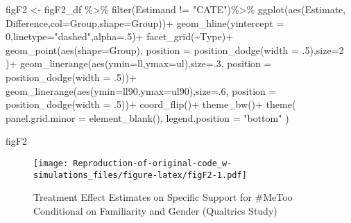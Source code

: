 \documentclass[
]{article}
\newenvironment{Shaded}{\begin{snugshade}}{\end{snugshade}}
\newcommand{\AttributeTok}[1]{\textcolor[rgb]{0.77,0.63,0.00}{#1}}
\newcommand{\DecValTok}[1]{\textcolor[rgb]{0.00,0.00,0.81}{#1}}
\newcommand{\FunctionTok}[1]{\textcolor[rgb]{0.00,0.00,0.00}{#1}}
\newcommand{\NormalTok}[1]{#1}
\newcommand{\OtherTok}[1]{\textcolor[rgb]{0.56,0.35,0.01}{#1}}
\newcommand{\SpecialCharTok}[1]{\textcolor[rgb]{0.00,0.00,0.00}{#1}}
\newcommand{\StringTok}[1]{\textcolor[rgb]{0.31,0.60,0.02}{#1}}
\begin{document}
\begin{Shaded}
\begin{Highlighting}[]
\NormalTok{figF2 }\OtherTok{\textless{}{-}}\NormalTok{ figF2\_df }\SpecialCharTok{\%\textgreater{}\%}
  \FunctionTok{filter}\NormalTok{(Estimand }\SpecialCharTok{!=} \StringTok{"CATE"}\NormalTok{)}\SpecialCharTok{\%\textgreater{}\%}
  \FunctionTok{ggplot}\NormalTok{(}\FunctionTok{aes}\NormalTok{(Estimate, Difference,}\AttributeTok{col=}\NormalTok{Group,}\AttributeTok{shape=}\NormalTok{Group))}\SpecialCharTok{+}
  \FunctionTok{geom\_hline}\NormalTok{(}\AttributeTok{yintercept =} \DecValTok{0}\NormalTok{,}\AttributeTok{linetype=}\StringTok{"dashed"}\NormalTok{,}\AttributeTok{alpha=}\NormalTok{.}\DecValTok{5}\NormalTok{)}\SpecialCharTok{+}
  \FunctionTok{facet\_grid}\NormalTok{(}\SpecialCharTok{\textasciitilde{}}\NormalTok{Type)}\SpecialCharTok{+}
  \FunctionTok{geom\_point}\NormalTok{(}\FunctionTok{aes}\NormalTok{(}\AttributeTok{shape=}\NormalTok{Group),}
                 \AttributeTok{position =} \FunctionTok{position\_dodge}\NormalTok{(}\AttributeTok{width =}\NormalTok{ .}\DecValTok{5}\NormalTok{),}\AttributeTok{size=}\DecValTok{2}
\NormalTok{      )}\SpecialCharTok{+}
  \FunctionTok{geom\_linerange}\NormalTok{(}\FunctionTok{aes}\NormalTok{(}\AttributeTok{ymin=}\NormalTok{ll,}\AttributeTok{ymax=}\NormalTok{ul),}\AttributeTok{size=}\NormalTok{.}\DecValTok{3}\NormalTok{,}
                       \AttributeTok{position =} \FunctionTok{position\_dodge}\NormalTok{(}\AttributeTok{width =}\NormalTok{ .}\DecValTok{5}\NormalTok{))}\SpecialCharTok{+}
  \FunctionTok{geom\_linerange}\NormalTok{(}\FunctionTok{aes}\NormalTok{(}\AttributeTok{ymin=}\NormalTok{ll90,}\AttributeTok{ymax=}\NormalTok{ul90),}\AttributeTok{size=}\NormalTok{.}\DecValTok{6}\NormalTok{,}
                     \AttributeTok{position =} \FunctionTok{position\_dodge}\NormalTok{(}\AttributeTok{width =}\NormalTok{ .}\DecValTok{5}\NormalTok{))}\SpecialCharTok{+}
  \FunctionTok{coord\_flip}\NormalTok{()}\SpecialCharTok{+}
  \FunctionTok{theme\_bw}\NormalTok{()}\SpecialCharTok{+}
  \FunctionTok{theme}\NormalTok{(}
    \AttributeTok{panel.grid.minor =} \FunctionTok{element\_blank}\NormalTok{(),}
    \AttributeTok{legend.position =} \StringTok{"bottom"}
\NormalTok{  )}

\NormalTok{figF2}
\end{Highlighting}
\end{Shaded}

\begin{figure}
\centering
\texttt{[image: Reproduction-of-original-code\_w-simulations\_files/figure-latex/figF2-1.pdf]}
\caption{Treatment Effect Estimates on Specific Support for \#MeToo
Conditional on Familiarity and Gender (Qualtrics Study)}
\end{figure}
\end{document}
